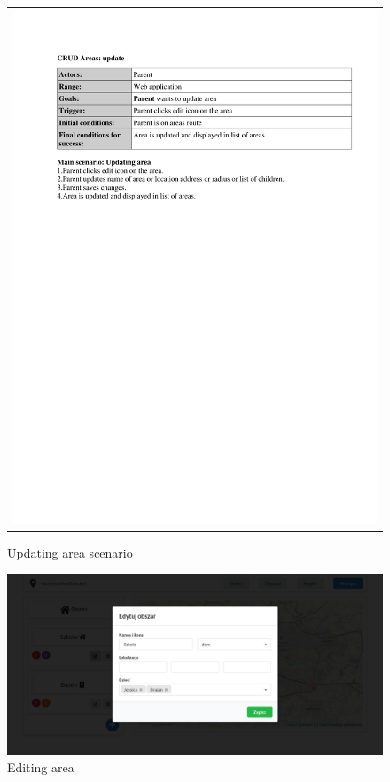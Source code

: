 \documentclass{sprawozdanie-agh}
\begin{document}
		\begin{figure}[H] 
			\centering
			\begin{tabular}{c}
				\includegraphics[width=.80\textwidth]{areaUpdate} 
			\end{tabular} 
		\caption{Updating area scenario}
		\end{figure}

		\begin{figure}[H]
			\centering
			\includegraphics[width=.80\textwidth]{editArea}
			\caption{Editing area}
		\end{figure}
\end{document}
